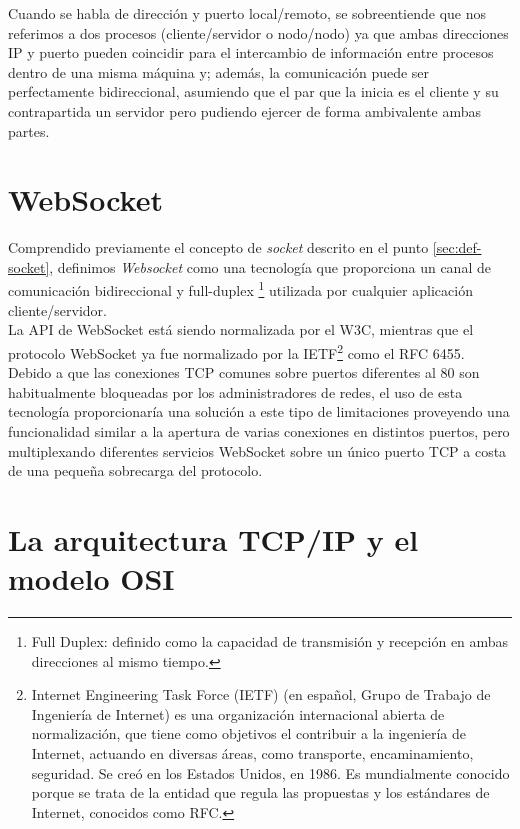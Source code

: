 Cuando se habla de dirección y puerto local/remoto, se sobreentiende que nos referimos a dos procesos (cliente/servidor o nodo/nodo) ya que ambas direcciones IP y puerto pueden coincidir para el intercambio de información entre procesos dentro de una misma máquina
y; además, la comunicación puede ser perfectamente bidireccional, asumiendo que el par que la inicia es el cliente y su contrapartida un servidor pero pudiendo ejercer de forma ambivalente ambas partes.\\


\section{WebSocket}
\label{sec:def-websocket}

Comprendido previamente el concepto de \emph{socket} descrito en el punto \ref{sec:def-socket}, definimos  \emph{Websocket} como una tecnología que proporciona un canal de comunicación bidireccional y full-duplex 
\footnote{Full Duplex: definido como la capacidad de transmisión y recepción en ambas direcciones al mismo tiempo. } utilizada por cualquier aplicación cliente/servidor.\\


La API de WebSocket está siendo normalizada por el W3C, mientras que el protocolo WebSocket ya fue normalizado por la IETF\footnote{Internet Engineering Task Force (IETF) (en español, Grupo de Trabajo de Ingeniería de Internet)
es una organización internacional abierta de normalización, que tiene como objetivos el contribuir a la ingeniería de Internet, actuando en diversas áreas, como transporte, encaminamiento, seguridad.
Se creó en los Estados Unidos, en 1986. Es mundialmente conocido porque se trata de la entidad que regula las propuestas y los estándares de Internet, conocidos como RFC.} como el RFC 6455.\\

Debido a que las conexiones TCP comunes sobre puertos diferentes al 80 son habitualmente bloqueadas por los administradores de redes, el uso de esta tecnología proporcionaría una solución
a este tipo de limitaciones proveyendo una funcionalidad similar a la apertura de varias conexiones en distintos puertos, pero multiplexando diferentes servicios WebSocket sobre un único
puerto TCP a costa de una pequeña sobrecarga del protocolo.\\

\section{La arquitectura TCP/IP y el modelo OSI}
\label{sec:modelo-osi}


